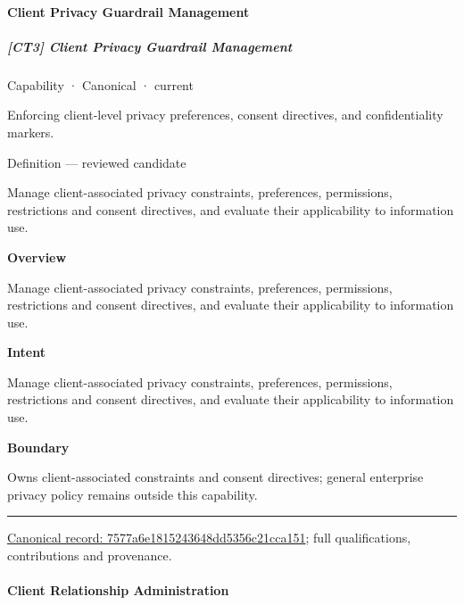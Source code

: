 \paragraph{Client Privacy Guardrail Management}

\subparagraph{[CT3] Client Privacy Guardrail Management}

\label{element:7577a6e1815243648dd5356c21cca151}
{\small Capability · Canonical · current}\par

Enforcing client-level privacy preferences, consent directives, and confidentiality markers.



Definition — reviewed candidate



Manage client-associated privacy constraints, preferences, permissions, restrictions and consent directives, and evaluate their applicability to information use.



\textbf{Overview}



Manage client-associated privacy constraints, preferences, permissions, restrictions and consent directives, and evaluate their applicability to information use.



\textbf{Intent}



Manage client-associated privacy constraints, preferences, permissions, restrictions and consent directives, and evaluate their applicability to information use.



\textbf{Boundary}



Owns client-associated constraints and consent directives; general enterprise privacy policy remains outside this capability.



\medskip\hrule\medskip

{\footnotesize \href{../../../../continuum/strategy/capability/7577a6e1815243648dd5356c21cca151.md}{Canonical record: 7577a6e1815243648dd5356c21cca151}; full qualifications, contributions and provenance.}\par
\paragraph{Client Relationship Administration}

